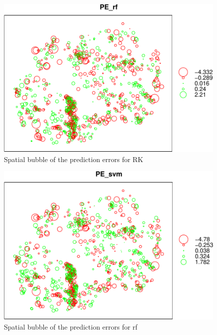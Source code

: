 \documentclass[10pt,b5paper,]{book}
\newenvironment{Shaded}{\begin{snugshade}}{\end{snugshade}}
\newcommand{\CommentTok}[1]{\textcolor[rgb]{0.56,0.35,0.01}{\textit{#1}}}
\newcommand{\DataTypeTok}[1]{\textcolor[rgb]{0.13,0.29,0.53}{#1}}
\newcommand{\DecValTok}[1]{\textcolor[rgb]{0.00,0.00,0.81}{#1}}
\newcommand{\KeywordTok}[1]{\textcolor[rgb]{0.13,0.29,0.53}{\textbf{#1}}}
\newcommand{\NormalTok}[1]{#1}
\newcommand{\OperatorTok}[1]{\textcolor[rgb]{0.81,0.36,0.00}{\textbf{#1}}}
\newcommand{\StringTok}[1]{\textcolor[rgb]{0.31,0.60,0.02}{#1}}
\theoremstyle{definition}
\theoremstyle{definition}
\theoremstyle{definition}
\theoremstyle{remark}
\begin{document}
\begin{Shaded}
\end{Shaded}

\begin{figure}
\includegraphics[width=0.6\linewidth]{SOCMapping_files/figure-latex/unnamed-chunk-89-1} \caption{Spatial bubble of the prediction errors for RK}\label{fig:unnamed-chunk-89}
\end{figure}

\begin{Shaded}
\end{Shaded}

\begin{figure}
\includegraphics[width=0.6\linewidth]{SOCMapping_files/figure-latex/unnamed-chunk-90-1} \caption{Spatial bubble of the prediction errors for rf}\label{fig:unnamed-chunk-90}
\end{figure}
\end{document}
